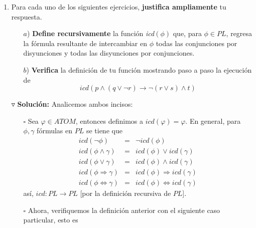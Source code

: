 \documentclass{article}
\begin{document}
\begin{enumerate}
\begin{itemize}
\begin{proof}
\begin{itemize}
\begin{eqnarray*}
        &=& con(\phi \Leftrightarrow \gamma) + 1
        \hspace*{3.3cm} \text{Definición de ``\textit{con}''.}
      \end{eqnarray*}
      \[
      \therefore \; atom(\phi \Leftrightarrow \gamma) \leq con(\phi \Leftrightarrow \gamma) + 1
      \]
    \end{itemize}
  \end{proof}
  \end{itemize}
%
\hfill $\lhd$
\item Para cada uno de los siguientes ejercicios, \textbf{justifica ampliamente}
  tu respuesta.
  \begin{itemize}
  \item[$a$)] \textbf{Define recursivamente} la función \textit{icd}$(\phi)$ que,
    para $\phi \in PL$, regresa la fórmula resultante de intercambiar en $\phi$
    todas las conjunciones por disyunciones y todas las disyunciones por conjunciones.
  \item[$b$)] \textbf{Verifica} la definición de tu función mostrando paso a paso
    la ejecución de
    \[
    icd(p \land (q \lor \neg r) \rightarrow \neg (r \lor s) \land t)
    \]
  \end{itemize}
  $\triangledown$ \textbf{Solución:}
  Analicemos ambos incisos:
  \begin{itemize}
  \item[$\square$] Sea $\varphi \in ATOM$, entonces definimos a $icd(\varphi) = \varphi$. En
    general, para $\phi, \gamma$ fórmulas en $PL$ se tiene que
    \begin{eqnarray*}
      icd(\neg \phi) &=& \neg icd(\phi)\\
      icd(\phi \land \gamma) &=& icd(\phi) \lor icd(\gamma)\\
      icd(\phi \lor \gamma) &=& icd(\phi) \land icd(\gamma)\\
      icd(\phi \Rightarrow \gamma) &=& icd(\phi) \Rightarrow icd(\gamma)\\
      icd(\phi \Leftrightarrow \gamma) &=& icd(\phi) \Leftrightarrow icd(\gamma)
    \end{eqnarray*}
    así, $icd: PL \rightarrow PL$ [por la definición recursiva de $PL$].
  \item[$\square$] Ahora, verifiquemos la definición anterior con el siguiente
    caso particular, esto es
  \end{itemize}
  \begin{eqnarray*}

\end{eqnarray*}
\end{enumerate}
\end{document}

